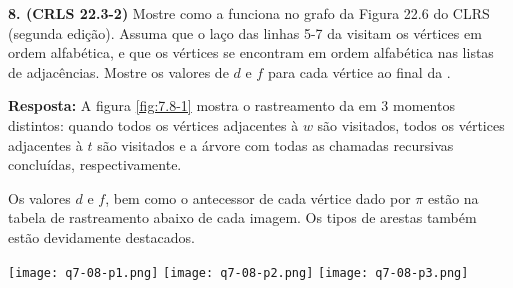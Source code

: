 
\noindent\textbf{8. (CRLS 22.3-2)} Mostre como a  funciona no grafo da Figura 22.6 do CLRS (segunda
edição). Assuma que o laço das linhas 5-7 da  visitam os vértices em ordem alfabética, e que
os vértices se encontram em ordem alfabética nas listas de adjacências. Mostre os valores de $d$ e $f$
para cada vértice ao final da .

\textbf{Resposta:} A figura \ref{fig:7.8-1} mostra o rastreamento da  em 3 momentos distintos: quando todos os vértices adjacentes à $w$ são visitados, todos os vértices adjacentes à $t$ são visitados e a árvore com todas as chamadas recursivas concluídas, respectivamente.

Os valores $d$ e $f$, bem como o antecessor de cada vértice dado por $\pi$ estão na tabela de rastreamento abaixo de cada imagem. Os tipos de arestas também estão devidamente destacados.

\begin{center}
\texttt{[image: q7-08-p1.png]}
\texttt{[image: q7-08-p2.png]}
\texttt{[image: q7-08-p3.png]}
\label{fig:7.8-1}
\end{center}